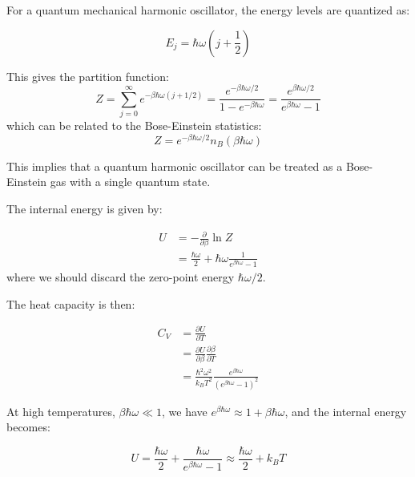 \documentclass[12pt]{article}
\begin{document}
For a quantum mechanical harmonic oscillator, the energy levels are quantized as:

\begin{equation}
    E_{j} = \hbar \omega \left( j + \frac{1}{2} \right)
\end{equation}

This gives the partition function:
\begin{equation}
    Z = \sum_{j=0}^{\infty} e^{-\beta \hbar \omega (j + 1/2)} = \frac{e^{-\beta \hbar \omega / 2}}{1 - e^{-\beta \hbar \omega}} = \frac{e^{\beta \hbar \omega / 2}}{e^{\beta \hbar \omega} - 1}
\end{equation}
which can be related to the Bose-Einstein statistics:
\begin{equation}
    Z = e^{-\beta \hbar \omega / 2} n_{B}(\beta \hbar \omega)
\end{equation}

This implies that a quantum harmonic oscillator can be treated as a Bose-Einstein gas with a single quantum state.

The internal energy is given by:

\begin{equation}
    \begin{split}
        U &= -\frac{\partial}{\partial \beta} \ln Z \\
        &= \frac{\hbar \omega}{2} + \hbar \omega \frac{1}{e^{\beta \hbar \omega} - 1}
    \end{split}
\end{equation}
where we should discard the zero-point energy $\hbar \omega / 2$.

The heat capacity is then:

\begin{equation}
    \begin{split}
        C_{V} &= \frac{\partial U}{\partial T} \\
        &= \frac{\partial U}{\partial \beta} \frac{\partial \beta}{\partial T} \\
        &= \frac{\hbar^{2} \omega^{2}}{k_{B}T^{2}} \frac{e^{\beta \hbar \omega}}{(e^{\beta \hbar \omega} - 1)^{2}}
    \end{split}
\end{equation}

At high temperatures, $\beta \hbar \omega \ll 1$, we have $e^{\beta \hbar \omega} \approx 1 + \beta \hbar \omega$, and the internal energy becomes:

\begin{equation}
    U = \frac{\hbar \omega}{2} + \frac{\hbar \omega}{e^{\beta \hbar \omega} - 1} \approx \frac{\hbar \omega}{2} + k_{B}T
\end{equation}
\end{document}
